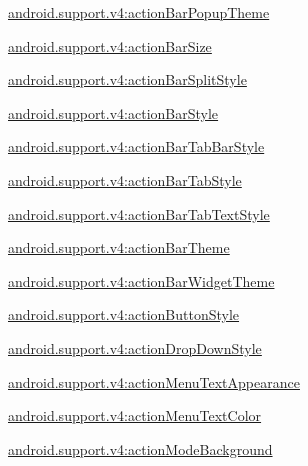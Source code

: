 {\ttfamily \hyperlink{classandroid_1_1support_1_1v4_1_1R_1_1styleable_add3e5d5f9d1b972dd09d10ff0cc47d4d}{android.\+support.\+v4\+:action\+Bar\+Popup\+Theme}}

{\ttfamily \hyperlink{classandroid_1_1support_1_1v4_1_1R_1_1styleable_aa92fde6683d052bff4e488f9f4dfdacc}{android.\+support.\+v4\+:action\+Bar\+Size}}

{\ttfamily \hyperlink{classandroid_1_1support_1_1v4_1_1R_1_1styleable_ab3556694f1ba3adfd224a083e4c5b5b2}{android.\+support.\+v4\+:action\+Bar\+Split\+Style}}

{\ttfamily \hyperlink{classandroid_1_1support_1_1v4_1_1R_1_1styleable_abfc7ed80904100dcd77301a5d21b8e1f}{android.\+support.\+v4\+:action\+Bar\+Style}}

{\ttfamily \hyperlink{classandroid_1_1support_1_1v4_1_1R_1_1styleable_a53ff434fe900f2e065169c843ae14dd4}{android.\+support.\+v4\+:action\+Bar\+Tab\+Bar\+Style}}

{\ttfamily \hyperlink{classandroid_1_1support_1_1v4_1_1R_1_1styleable_ace82d68d7bf21eba34ee1fc9395ad742}{android.\+support.\+v4\+:action\+Bar\+Tab\+Style}}

{\ttfamily \hyperlink{classandroid_1_1support_1_1v4_1_1R_1_1styleable_af037c9c5d52f2269044bf14075a0a624}{android.\+support.\+v4\+:action\+Bar\+Tab\+Text\+Style}}

{\ttfamily \hyperlink{classandroid_1_1support_1_1v4_1_1R_1_1styleable_a0a71bc29ce92a20e2a10e528565e55bf}{android.\+support.\+v4\+:action\+Bar\+Theme}}

{\ttfamily \hyperlink{classandroid_1_1support_1_1v4_1_1R_1_1styleable_a0d30112c3d0cc880197dd311dbbf7def}{android.\+support.\+v4\+:action\+Bar\+Widget\+Theme}}

{\ttfamily \hyperlink{classandroid_1_1support_1_1v4_1_1R_1_1styleable_a80982be55634192a193cf55c01a21de4}{android.\+support.\+v4\+:action\+Button\+Style}}

{\ttfamily \hyperlink{classandroid_1_1support_1_1v4_1_1R_1_1styleable_a31fc54e0e58a5938661e66469a5a5b5f}{android.\+support.\+v4\+:action\+Drop\+Down\+Style}}

{\ttfamily \hyperlink{classandroid_1_1support_1_1v4_1_1R_1_1styleable_a8d4a63cac0fa21d43ff5e5b99a180331}{android.\+support.\+v4\+:action\+Menu\+Text\+Appearance}}

{\ttfamily \hyperlink{classandroid_1_1support_1_1v4_1_1R_1_1styleable_a42c5c79dac7e9099ffa7eec510614d9f}{android.\+support.\+v4\+:action\+Menu\+Text\+Color}}

{\ttfamily \hyperlink{classandroid_1_1support_1_1v4_1_1R_1_1styleable_afefcbfb79f6f036571910bdb524294fe}{android.\+support.\+v4\+:action\+Mode\+Background}}

